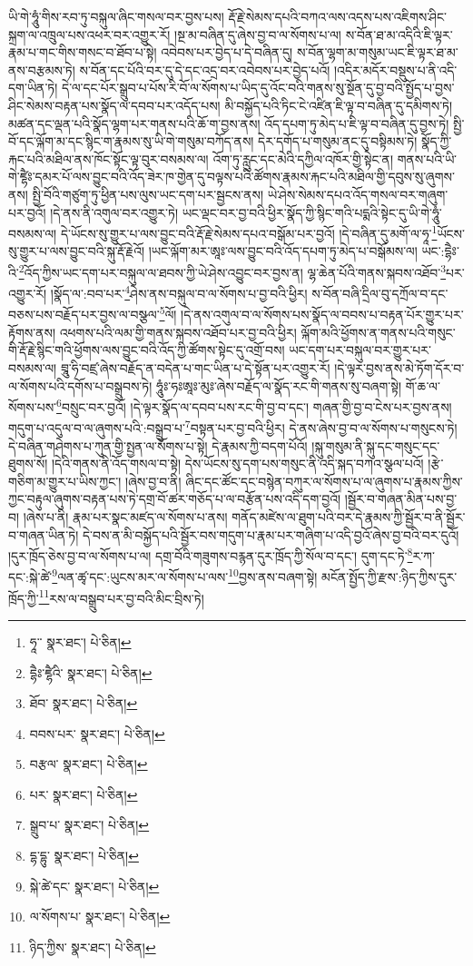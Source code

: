 ཡི་གེ་ཧཱུཾ་གིས་རབ་ཏུ་བསྐུལ་ཞིང་གསལ་བར་བྱས་པས། རྡོ་རྗེ་སེམས་དཔའི་བཀའ་ལས་འདས་པས་འཇིགས་ཤིང་སྐྲག་ལ་འཁྲུལ་པས་འཕར་བར་འགྱུར་རོ། །སྔ་མ་བཞིན་དུ་ཞེས་བྱ་བ་ལ་སོགས་པ་ལ། ས་བོན་ཐ་མ་འདིའི་ཇི་ལྟར་རྣམ་པ་གང་གིས་གསང་བ་ཐོབ་པ་སྟེ། འབེབས་པར་བྱེད་པ་དེ་བཞིན་དུ། ས་བོན་ལྷག་མ་གསུམ་ཡང་ཇི་ལྟར་ཐ་མ་ནས་བརྩམས་ཏེ། ས་བོན་དང་པོའི་བར་དུ་དེ་དང་འདྲ་བར་འབེབས་པར་བྱེད་པའོ། །འདིར་མདོར་བསྡུས་པ་ནི་འདི་དག་ཡིན་ཏེ། དེ་ལ་དང་པོར་སྒྲུབ་པ་པོས་རི་བོ་ལ་སོགས་པ་ཡིད་དུ་འོང་བའི་གནས་སུ་སྔོན་དུ་བྱ་བའི་སྤྱོད་པ་བྱས་ཤིང་སེམས་བརྟན་པས་སྣོད་ལ་དབབ་པར་འདོད་པས། མི་བསྐྱོད་པའི་ཏིང་ངེ་འཛིན་ཇི་ལྟ་བ་བཞིན་དུ་དམིགས་ཏེ། མཚན་དང་ལྡན་པའི་སྣོད་ལྷག་པར་གནས་པའི་ཆོ་ག་བྱས་ནས། འོད་དཔག་ཏུ་མེད་པ་ཇི་ལྟ་བ་བཞིན་དུ་བྱས་ཏེ། སྤྱི་བོ་དང་ལྐོག་མ་དང་སྙིང་ག་རྣམས་སུ་ཡི་གེ་གསུམ་བཀོད་ནས། དེར་དགོད་པ་གསུམ་ནང་དུ་བསྟིམས་ཏེ། སྣོད་ཀྱི་རྐང་པའི་མཐིལ་ནས་ཁོང་སྟོང་ལྟ་བུར་བསམས་ལ། འོག་ཏུ་རླུང་དང་མེའི་དཀྱིལ་འཁོར་གྱི་སྟེང་ན། གནས་པའི་ཡི་གེ་ཛྷཻཿ་དམར་པོ་ལས་བྱུང་བའི་འོད་ཟེར་ཁ་གྱེན་དུ་བལྟས་པའི་ཚོགས་རྣམས་རྐང་པའི་མཐིལ་གྱི་དབུས་སུ་ཞུགས་ནས། སྤྱི་བོའི་གཙུག་ཏུ་ཕྱིན་པས་ལུས་ཡང་དག་པར་སྦྱངས་ནས། ཡེ་ཤེས་སེམས་དཔའ་འོད་གསལ་བར་གཞུག་པར་བྱའོ། །དེ་ནས་ནི་འགུལ་བར་འགྱུར་ཏེ། ཡང་ལྡང་བར་བྱ་བའི་ཕྱིར་སྣོད་ཀྱི་སྙིང་གའི་པདྨའི་སྟེང་དུ་ཡི་གེ་ཧཱུཾ་བསམས་ལ། དེ་ཡོངས་སུ་གྱུར་པ་ལས་བྱུང་བའི་རྡོ་རྗེ་སེམས་དཔའ་བསྒོམ་པར་བྱའོ། །དེ་བཞིན་དུ་མགོ་ལ་ཧཱ་\footnote{ཧཱ་་  སྣར་ཐང་།  པེ་ཅིན། }ཡོངས་སུ་གྱུར་པ་ལས་བྱུང་བའི་སྐུ་རྡོ་རྗེའོ། །ཡང་ལྐོག་མར་ཨཱཿ་ལས་བྱུང་བའི་འོད་དཔག་ཏུ་མེད་པ་བསྒོམས་ལ། ཡང་:དྷཻཿ་འི་\footnote{དྷཻཿ་ཛྷཻའི་  སྣར་ཐང་།  པེ་ཅིན། }འོད་ཀྱིས་ཡང་དག་པར་བསྐུལ་ལ་ཐབས་ཀྱི་ཡེ་ཤེས་འབྱུང་བར་བྱས་ན། ལྷ་ཆེན་པོའི་གནས་སྐབས་འཐོབ་\footnote{ཐོབ་  སྣར་ཐང་།  པེ་ཅིན། }པར་འགྱུར་རོ། །སྣོད་ལ་:བབ་པར་\footnote{བབས་པར་  སྣར་ཐང་།  པེ་ཅིན། }ཤེས་ནས་བསྐུལ་བ་ལ་སོགས་པ་བྱ་བའི་ཕྱིར། ས་བོན་བཞི་དྲིལ་བུ་དཀྲོལ་བ་དང་བཅས་པས་བརྗོད་པར་བྱས་ལ་བསྩལ་\footnote{བརྩལ་  སྣར་ཐང་།  པེ་ཅིན། }ལོ། །དེ་ནས་འགུལ་བ་ལ་སོགས་པས་སྣོད་ལ་བབས་པ་བརྟན་པོར་གྱུར་པར་རྟོགས་ནས། འཕགས་པའི་ལམ་གྱི་གནས་སྐབས་འཐོབ་པར་བྱ་བའི་ཕྱིར། ལྐོག་མའི་ཕྱོགས་ན་གནས་པའི་གསུང་གི་རྡོ་རྗེ་སྙིང་གའི་ཕྱོགས་ལས་བྱུང་བའི་འོད་ཀྱི་ཚོགས་སྟེང་དུ་འགྲོ་བས། ཡང་དག་པར་བསྐུལ་བར་གྱུར་པར་བསམས་ལ། བྲཱུ་ཧི་བཛྲ་ཞེས་བརྗོད་ན་བདེན་པ་གང་ཡིན་པ་དེ་སྟོན་པར་འགྱུར་རོ། །དེ་ལྟར་བྱས་ནས་མེ་ཏོག་དོར་བ་ལ་སོགས་པའི་དགོས་པ་བསྒྲུབས་ཏེ། ཧཱུཾཿ་ཧཿཨཱཿ་མུཿ་ཞེས་བརྗོད་ལ་སྣོད་རང་གི་གནས་སུ་བཞག་སྟེ། གོ་ཆ་ལ་སོགས་པས་\footnote{པར་  སྣར་ཐང་།  པེ་ཅིན། }བསྲུང་བར་བྱའོ། །དེ་ལྟར་སྣོད་ལ་དབབ་པས་རང་གི་བྱ་བ་དང་། གཞན་གྱི་བྱ་བ་ངེས་པར་བྱས་ནས། གདུག་པ་འདུལ་བ་ལ་ཞུགས་པའི་:བསྒྲུབ་པ་\footnote{སྒྲུབ་པ་  སྣར་ཐང་།  པེ་ཅིན། }བསྟན་པར་བྱ་བའི་ཕྱིར། དེ་ནས་ཞེས་བྱ་བ་ལ་སོགས་པ་གསུངས་ཏེ། དེ་བཞིན་གཤེགས་པ་ཀུན་གྱི་སྤྱན་ལ་སོགས་པ་སྟེ། དེ་རྣམས་ཀྱི་བདག་པོའོ། །སྐུ་གསུམ་ནི་སྐུ་དང་གསུང་དང་ཐུགས་སོ། །དེའི་གནས་ནི་འོད་གསལ་བ་སྟེ། དེས་ཡོངས་སུ་དག་པས་གསུང་ནི་འདི་སྐད་བཀའ་སྩལ་པའོ། །རྩེ་གཅིག་མ་གྱུར་པ་ཡིས་ཀྱང་། །ཞེས་བྱ་བ་ནི། ཞིང་དང་ཚོང་དང་བསྙེན་བཀུར་ལ་སོགས་པ་ལ་ཞུགས་པ་རྣམས་ཀྱིས་ཀྱང་བརྟུལ་ཞུགས་བརྟན་པས་ཏེ་དགྲ་བོ་ཚར་གཅོད་པ་ལ་བརྩོན་པས་འདི་དག་བྱའོ། །སྦྱོར་བ་གཞན་མིན་པས་བྱ་བ། །ཞེས་པ་ནི། རྣམ་པར་སྣང་མཛད་ལ་སོགས་པ་ནས། གནོད་མཛེས་ལ་ཐུག་པའི་བར་དེ་རྣམས་ཀྱི་སྦྱོར་བ་ནི་སྦྱོར་བ་གཞན་ཡིན་ཏེ། དེ་བས་ན་མི་བསྐྱོད་པའི་སྦྱོར་བས་གདུག་པ་རྣམ་པར་གཞིག་པ་འདི་བྱའོ་ཞེས་བྱ་བའི་བར་དུའོ། །དུར་ཁྲོད་ཅེས་བྱ་བ་ལ་སོགས་པ་ལ། དགྲ་བོའི་གཟུགས་བརྙན་དུར་ཁྲོད་ཀྱི་སོལ་བ་དང་། དུག་དང་ཏེ་\footnote{དྷ་དྷུ་  སྣར་ཐང་།  པེ་ཅིན། }ར་ཀ་དང་:སྐེ་ཚེ་\footnote{སྐེ་ཚེ་དང་  སྣར་ཐང་།  པེ་ཅིན། }ལན་ཚྭ་དང་:ཡུངས་མར་ལ་སོགས་པ་ལས་\footnote{ལ་སོགས་པ་  སྣར་ཐང་།  པེ་ཅིན། }བྱས་ནས་བཞག་སྟེ། མངོན་སྤྱོད་ཀྱི་རྫས་:ཉིད་ཀྱིས་དུར་ཁྲོད་ཀྱི་\footnote{ཉིད་ཀྱིས་  སྣར་ཐང་།  པེ་ཅིན། }རས་ལ་བསྒྲུབ་པར་བྱ་བའི་མིང་བྲིས་ཏེ། 